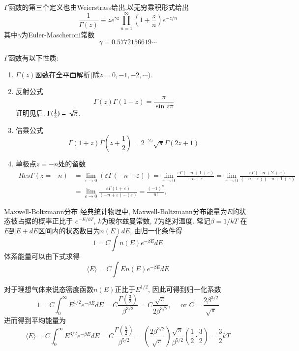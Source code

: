 $\Gamma$函数的第三个定义也由Weierstrass给出,以无穷乘积形式给出
\begin{equation}
\frac{1}{\Gamma(z)} \equiv z e^{\gamma z} \prod_{n=1}^{\infty}\left(1+\frac{z}{n}\right) e^{-z / n}
\end{equation}
其中$\gamma$为Euler-Mascheroni常数
$$
\gamma=0.5772156619 \cdots
$$

$\Gamma$函数有以下性质:
\begin{enumerate}
    \item $\Gamma(z)$函数在全平面解析(除$z=0, -1, -2, \cdots$).
    \item 反射公式
    $$
        \Gamma(z) \Gamma(1-z)=\frac{\pi}{\sin z \pi}
    $$ 证明见后. $\Gamma({\frac{1}{2}}) = \sqrt{\pi}$.
    \item 倍乘公式
    $$
    \Gamma(1+z) \Gamma\left(z+\frac{1}{2}\right)=2^{-2 z} \sqrt{\pi} \Gamma(2 z+1)
    $$
    \item 单极点$z=-n$处的留数
    $$
    \begin{aligned}
    Res \Gamma(z=-n) & =\lim _{\varepsilon \rightarrow 0}(\varepsilon \Gamma(-n+\varepsilon))=\lim _{\varepsilon \rightarrow 0} \frac{\varepsilon \Gamma(-n+1+\varepsilon)}{-n+\varepsilon}=\lim _{\varepsilon \rightarrow 0} \frac{\varepsilon \Gamma(-n+2+\varepsilon)}{(-n+\varepsilon)(-n+1+\varepsilon)} \\
    & =\lim _{\varepsilon \rightarrow 0} \frac{\varepsilon \Gamma(1+\varepsilon)}{(-n+\varepsilon) \cdots(\varepsilon)}=\frac{(-1)^{n}}{n !},
    \end{aligned}
    $$
\end{enumerate}

\begin{examplebox}{Maxwell-Boltzmann分布}
    经典统计物理中, Maxwell-Boltzmann分布能量为$E$的状态被占据的概率正比于
    $e^{-E/kT}$, $k$为玻尔兹曼常数, $T$为绝对温度. 常记$\beta=1 / k T$
    在$E$到$E+dE$区间内的状态数目为$n(E) dE$, 由归一化条件得
    $$
    1=C \int n(E) e^{-\beta E} d E
    $$
    体系能量可以由下式求得
    $$
    \langle E\rangle=C \int E n(E) e^{-\beta E} d E
    $$


    对于理想气体来说态密度函数$n(E)$正比于$E^{1/2}$, 因此可得到归一化系数
    $$
    1=C \int_0^{\infty} E^{1 / 2} e^{-\beta E} d E=C \frac{\Gamma\left(\frac{3}{2}\right)}{\beta^{3 / 2}}=C \frac{\sqrt{\pi}}{2 \beta^{3 / 2}}, \quad \text { or } C=\frac{2 \beta^{3 / 2}}{\sqrt{\pi}}
    $$
    进而得到平均能量为
    $$
    \langle E\rangle=C \int_{0}^{\infty} E^{3 / 2} e^{-\beta E} d E=C \frac{\Gamma\left(\frac{5}{2}\right)}{\beta^{5 / 2}}=\left(\frac{2 \beta^{3 / 2}}{\sqrt{\pi}}\right) \frac{\sqrt{\pi}}{\beta^{5 / 2}}\left(\frac{1}{2} \cdot \frac{3}{2}\right)=\frac{3}{2} k T
    $$
\end{examplebox}

